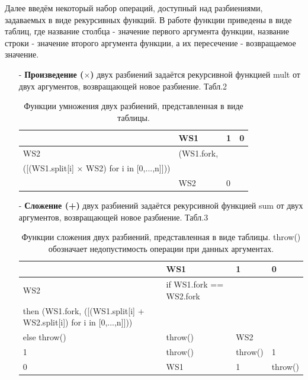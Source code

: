 \documentclass[a4paper,12pt]{article}
\begin{document}
Далее введём некоторый набор операций, доступный над разбиениями, задаваемых в виде рекурсивных функций.
В работе функции приведены в виде таблиц, где название столбца - значение первого аргумента функции, название строки - значение второго аргумента функции, а их пересечение - возвращаемое значение.
\begin{enumerate}
\item[-] \textbf{Произведение ($\times$)} двух разбиений задаётся рекурсивной функцией mult от двух аргументов, возвращающей  новое разбиение. Табл.2
\begin{table}[!h]
\centering
\caption{Функции умножения двух разбиений, представленная в виде таблицы. }
    \begin{tabular}{|l|>{\centering}m{8cm} |l|l|}
    \hline
    ~   & WS1                                                                              & 1       & 0       \\ \hline
    WS2 & (WS1.fork,\\
    ([(WS1.split[i] $\times$ WS2) for i in [0,...,n]]))\\
      & WS2  & 0    \\ \hline
    \end{tabular}
\label{tab:mult}
\end{table}

\item[-] \textbf{Сложение (+)} двух разбиений задаётся рекурсивной функцией sum от двух аргументов, возвращающей  новое разбиение. Табл.3

\begin{table}[!h]
\centering
\caption{Функции сложения двух разбиений, представленная в виде таблицы. throw() обозначает недопустимость операции при данных аргументах. }\label{tab:sum}
    \begin{tabular}{|l|>{\centering}m{8cm} |l|l|}
    \hline
    ~   & WS1                                                                              & 1       & 0       \\ \hline
    WS2 & if WS1.fork == WS2.fork \\
    then (WS1.fork, ([(WS1.split[i] + WS2.split[i]) for i in [0,...,n]]))\\
     else throw() & throw() & WS2     \\ \hline
    1   & throw()                                                                          & throw() & 1       \\ \hline
    0   & WS1                                                                              & 1       & throw() \\ \hline
    \end{tabular}
\end{table}



\end{enumerate}
\end{document}

